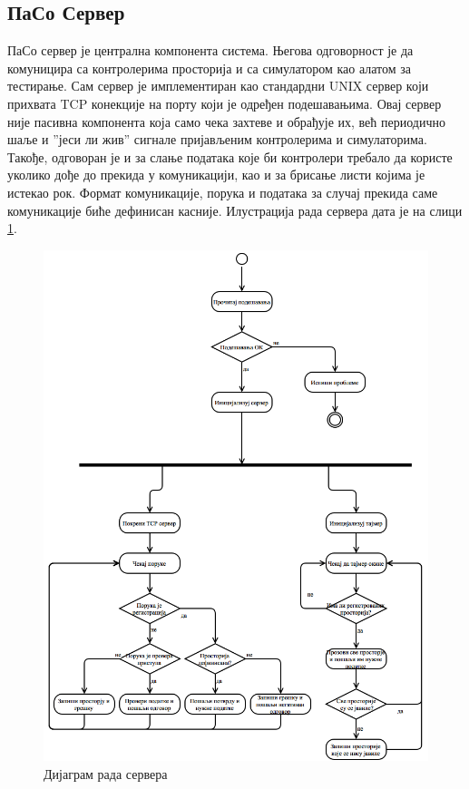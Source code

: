 \documentclass[a4paper, 12pt, diplomski]{etfcyr}
\begin{document}
			\subsection{ПаСо Сервер}
				\begin{justify}
					ПаСо сервер је централна компонента система. Његова одговорност је да комуницира са контролерима просторија и са симулатором као алатом за тестирање. Сам сервер је имплементиран као стандардни UNIX сервер који прихвата TCP конекције на порту који је одређен подешавањима. Овај сервер није пасивна компонента која само чека захтеве и обрађује их, већ периодично шаље и ”јеси ли жив” сигнале пријављеним контролерима и симулаторима. Такође, одговоран је и за слање података које би контролери требало да користе уколико дође до прекида у комуникацији, као и за брисање листи којима је истекао рок. Формат комуникације, порука и података за случај прекида саме комуникације биће дефинисан касније.
					Илустрација рада сервера дата је на слици \ref{figure:3}.
					\begin{figure}[h]
						\begin{center}
							\includegraphics[scale=0.35]{ServerWorkflow.png}
						\end{center}
						\caption{Дијаграм рада сервера}
						\label{figure:3}
					\end{figure}
				\end{justify}
\end{document}
